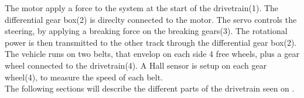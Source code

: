 The motor apply a force to the system at the start of the drivetrain(1). The differential gear box(2) is direclty connected to the motor. The servo controls the steering, by applying a breaking force on the breaking gears(3). The rotational power is then transmitted to the other track through the differential gear box(2). The vehicle runs on two belts, that envelop on each side 4 free wheels, plus a gear wheel connected to the drivetrain(4). A Hall sensor is setup on each gear wheel(4), to measure the speed of each belt.\\
The following sections will describe the different parts of the drivetrain seen on .\\